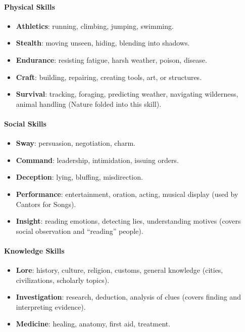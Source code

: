 \paragraph{Physical Skills}
\begin{itemize}
  \item \textbf{Athletics}: running, climbing, jumping, swimming.
  \item \textbf{Stealth}: moving unseen, hiding, blending into shadows.
  \item \textbf{Endurance}: resisting fatigue, harsh weather, poison, disease.
  \item \textbf{Craft}: building, repairing, creating tools, art, or structures.
  \item \textbf{Survival}: tracking, foraging, predicting weather, navigating wilderness, animal handling (Nature folded into this skill).
\end{itemize}

\paragraph{Social Skills}
\begin{itemize}
  \item \textbf{Sway}: persuasion, negotiation, charm.
  \item \textbf{Command}: leadership, intimidation, issuing orders.
  \item \textbf{Deception}: lying, bluffing, misdirection.
  \item \textbf{Performance}: entertainment, oration, acting, musical display (used by Cantors for Songs).
  \item \textbf{Insight}: reading emotions, detecting lies, understanding motives (covers social observation and ``reading'' people).
\end{itemize}

\paragraph{Knowledge Skills}
\begin{itemize}
  \item \textbf{Lore}: history, culture, religion, customs, general knowledge (cities, civilizations, scholarly topics).
  \item \textbf{Investigation}: research, deduction, analysis of clues (covers finding and interpreting evidence).
  \item \textbf{Medicine}: healing, anatomy, first aid, treatment.
\end{itemize}

